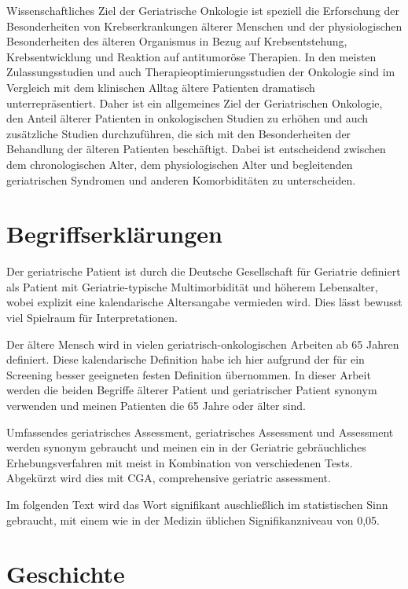 Wissenschaftliches Ziel der Geriatrische Onkologie ist speziell die
Erforschung der Besonderheiten von Krebserkrankungen älterer Menschen
und der physiologischen Besonderheiten des älteren Organismus in Bezug
auf Krebsentstehung, Krebsentwicklung und Reaktion auf antitumoröse
Therapien. In den meisten Zulassungsstudien und auch
Therapieoptimierungsstudien der Onkologie sind im Vergleich mit dem
klinischen Alltag ältere Patienten dramatisch
unterrepräsentiert. Daher ist ein allgemeines Ziel der Geriatrischen
Onkologie, den Anteil älterer Patienten in onkologischen Studien zu
erhöhen und auch zusätzliche Studien durchzuführen, die sich mit den
Besonderheiten der Behandlung der älteren Patienten beschäftigt. Dabei
ist entscheidend zwischen dem chronologischen Alter, dem
physiologischen Alter und begleitenden geriatrischen Syndromen und
anderen Komorbiditäten zu unterscheiden.

\section{Begriffserklärungen}

Der geriatrische Patient ist durch die Deutsche Gesellschaft für
Geriatrie definiert als Patient mit Geriatrie-typische Multimorbidität
und höherem Lebensalter, wobei explizit eine kalendarische
Altersangabe vermieden wird. Dies lässt bewusst viel Spielraum für
Interpretationen.

Der ältere Mensch wird in vielen geriatrisch-onkologischen Arbeiten ab
65 Jahren definiert. Diese kalendarische Definition habe ich hier
aufgrund der für ein Screening besser geeigneten festen Definition
übernommen.  In dieser Arbeit werden die beiden Begriffe älterer
Patient und geriatrischer Patient synonym verwenden und meinen
Patienten die 65 Jahre oder älter sind.

Umfassendes geriatrisches Assessment, geriatrisches Assessment und
Assessment werden synonym gebraucht und meinen ein in der Geriatrie
gebräuchliches Erhebungsverfahren mit meist in Kombination von
verschiedenen Tests. Abgekürzt wird dies mit CGA, comprehensive
geriatric assessment.

Im folgenden Text wird das Wort signifikant auschließlich im
statistischen Sinn gebraucht, mit einem wie in der Medizin üblichen
Signifikanzniveau von 0,05.

\section{Geschichte}

